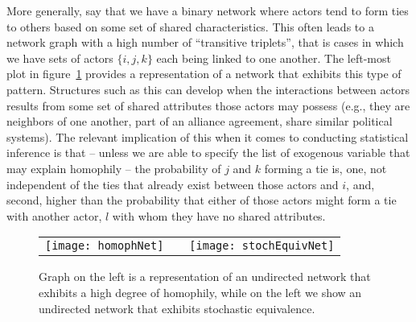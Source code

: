 More generally, say that we have a binary network where actors tend to form ties to others based on some set of shared characteristics. This often leads to a network graph with a high number of ``transitive triplets'', that is cases in which we have sets of actors $\{i,j,k\}$ each being linked to one another. The left-most plot in figure~\ref{fig:homphStochEquivNet} provides a representation of a network that exhibits this type of pattern. Structures such as this can develop when the interactions between actors results from some set of shared attributes those actors may possess (e.g., they are neighbors of one another, part of an alliance agreement, share similar political systems). The relevant implication of this when it comes to conducting statistical inference is that -- unless we are able to specify the list of exogenous variable that may explain homophily -- the probability of $j$ and $k$ forming a tie is, one, not independent of the ties that already exist between those actors and $i$, and, second, higher than the probability that either of those actors might form a tie with another actor, $l$ with whom they have no shared attributes. 

\begin{figure}[ht]
	\centering
	\begin{tabular}{lcr}
	\texttt{[image: homophNet]} & \hspace{2cm} &
	\texttt{[image: stochEquivNet]}	
	\end{tabular}
	\caption{Graph on the left is a representation of an undirected network that exhibits a high degree of homophily, while on the left we show an undirected network that exhibits stochastic equivalence. }
	\label{fig:homphStochEquivNet}
\end{figure}

